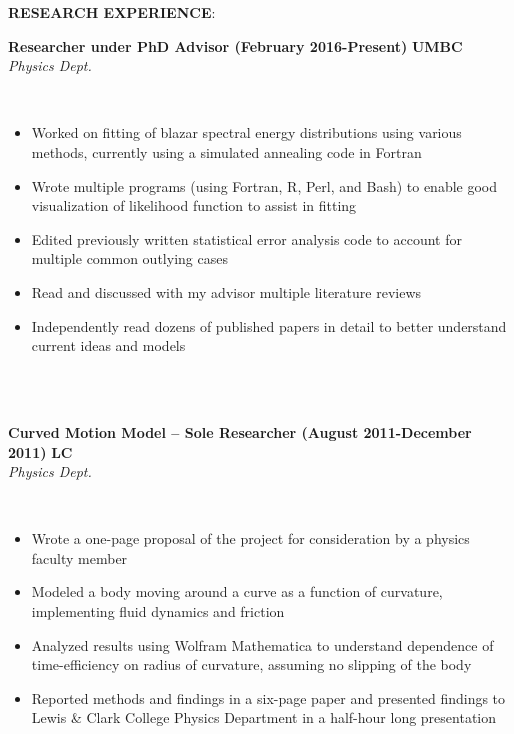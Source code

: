 \documentclass{article}
\begin{document}
\par 
\noindent \textbf{RESEARCH EXPERIENCE}:\\
\begin{vwcol}[widths={0.8,0.2}, sep=.8cm, justify=flush, rule=0pt, indent=0em]
\noindent \textbf{Researcher under PhD Advisor (February 2016-Present)}
\newpage
\noindent \textbf{UMBC}\\
\noindent \emph{Physics Dept.}
\end{vwcol}
\phantom \\
\begin{itemize}
\item Worked on fitting of blazar spectral energy distributions using various methods, currently using a simulated annealing code in Fortran
\item Wrote multiple programs (using Fortran, R, Perl, and Bash) to enable good visualization of likelihood function to assist in fitting
\item Edited previously written statistical error analysis code to account for multiple common outlying cases
\item Read and discussed with my advisor multiple literature reviews
\item Independently read dozens of published papers in detail to better understand current ideas and models
\end{itemize}
\phantom \\
\phantom \\
%
%
%
%
\begin{vwcol}[widths={0.8,0.2}, sep=.8cm, justify=flush, rule=0pt, indent=0em]
\noindent \textbf{Curved Motion Model – Sole Researcher (August 2011-December 2011)}
\newpage
\noindent \textbf{LC}\\
\noindent \emph{Physics Dept.}
\end{vwcol}
\phantom \\
\begin{itemize}
\item Wrote a one-page proposal of the project for consideration by a physics faculty member
\item Modeled a body moving around a curve as a function of curvature, implementing fluid dynamics and friction
\item Analyzed results using Wolfram Mathematica to understand dependence of time-efficiency on radius of curvature, assuming no slipping of the body
\item Reported methods and findings in a six-page paper and presented findings to Lewis \& Clark College Physics Department in a half-hour long presentation
\end{itemize}
\end{document}
